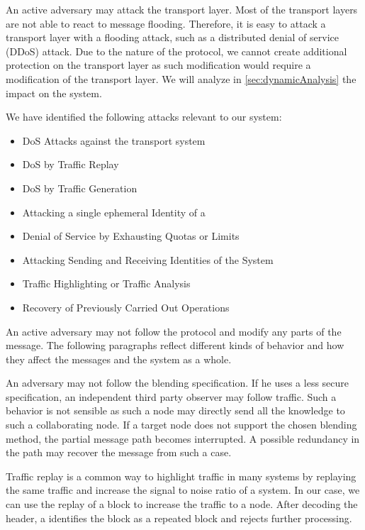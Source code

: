 An active adversary may attack the transport layer. Most of the transport layers are not able to react to message flooding. Therefore, it is easy to attack a transport layer with a flooding attack, such as a distributed denial of service (DDoS) attack. Due to the nature of the protocol, we cannot create additional protection on the transport layer as such modification would require a modification of the transport layer. We will analyze in \cref{sec:dynamicAnalysis} the impact on the \MessageVortex{} system.

We have identified the following attacks relevant to our system:
\begin{itemize}
	\item DoS Attacks against the transport system
	\item DoS by Traffic Replay
	\item DoS by Traffic Generation
	\item Attacking a single ephemeral Identity of a \VortexNode
	\item Denial of Service by Exhausting Quotas or Limits
	\item Attacking Sending and Receiving Identities of the \MessageVortex{} System
	\item Traffic Highlighting or Traffic Analysis
	\item Recovery of Previously Carried Out Operations
\end{itemize}

An active adversary may not follow the protocol and modify any parts of the message. The following paragraphs reflect different kinds of behavior and how they affect the messages and the system as a whole.

An adversary may not follow the blending specification. If he uses a less secure specification, an independent third party observer may follow traffic. Such a behavior is not sensible as such a node may directly send all the knowledge to such a collaborating node. If a  target node does not support the chosen blending method, the partial message path becomes interrupted. A possible redundancy in the path may recover the message from such a case.

Traffic replay is a common way to highlight traffic in many systems by replaying the same traffic and increase the signal to noise ratio of a system. In our case, we can use the replay of a \VortexMessage block to increase the traffic to a node. After decoding the header, a \VortexNode{} identifies the block as a repeated block and rejects further processing. 

